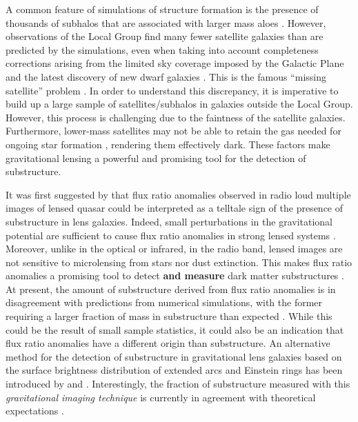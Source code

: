 \documentclass[useAMS,usenatbib]{mn2e}
\begin{document}
A common feature of simulations of structure formation is the presence
of thousands of subhalos that are associated with larger mass aloes \citep[e.g.][]{Springel08}.
However, observations of the Local Group find many fewer satellite
galaxies than are predicted by the simulations, even when taking into
account completeness corrections arising from the limited sky coverage
imposed by the Galactic Plane and the latest discovery of new dwarf galaxies \citep{DES15,Kop15}.  
This is the famous ``missing satellite'' problem \citep{Klypin1999, Moore1999, S07}. In order to
understand this discrepancy, it is imperative to build up a large
sample of satellites/subhalos in galaxies outside the Local Group.
 However, this process is challenging due to the faintness of the satellite
galaxies.  Furthermore, lower-mass satellites may not be able to
retain the gas needed for ongoing star formation \citep[e.g.,][]{P11},
rendering them effectively dark.  These factors make gravitational
lensing a powerful and promising tool for the detection of
substructure.

It was first suggested by \citet{Mao1998} that flux ratio anomalies
observed in radio loud multiple images of lensed quasar could be
interpreted as a telltale sign of the presence of substructure in lens
galaxies.  Indeed, small perturbations in the gravitational potential
are sufficient to cause flux ratio anomalies in strong lensed systems
\citep{Bradac02}.  Moreover, unlike in the optical or infrared, in the
radio band, lensed images are not sensitive to microlensing from
stars nor dust extinction. This makes flux ratio anomalies a promising
tool to detect \textbf{and measure} dark matter substructures \citep{Dalal2002, N13}.  At
present, the amount of substructure derived from flux ratio anomalies
is in disagreement with predictions from numerical simulations, with
the former requiring a larger fraction of mass in substructure than
expected \citep{Xu14}. While this could be the result of small sample
statistics, it could also be an indication that flux ratio anomalies
have a different origin than substructure.
%
An alternative method for
the detection of substructure in gravitational lens galaxies based on
the surface brightness distribution of extended arcs and Einstein rings
has been introduced by \citet{K05} and \citet{V09}. Interestingly, the fraction of
substructure measured with this \emph{gravitational imaging technique}
is currently in agreement with theoretical expectations \citep{V14a}.
\end{document}
